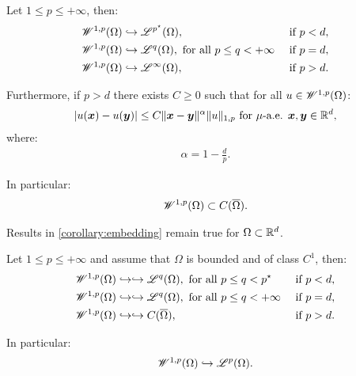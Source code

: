 \begin{corollary}
    Let $1 \leq p \leq +\infty$, then:
    \begin{align}
        & \mathscr{W}^{1, p}(\Omega) \hookrightarrow \mathscr{L}^{p^{\star}}(\Omega), & \text{ if } p < d, \\
        & \mathscr{W}^{1, p}(\Omega) \hookrightarrow \mathscr{L}^{q}(\Omega), \text{ for all } p \leq q < +\infty & \text{ if } p = d, \\
        & \mathscr{W}^{1, p}(\Omega) \hookrightarrow \mathscr{L}^{\infty}(\Omega), & \text{ if } p > d.
    \end{align}

    Furthermore, if $p > d$ there exists $C \geq 0$ such that for all $u \in \mathscr{W}^{1, p}(\Omega)$:
    \begin{gather}
        \lvert u(\bm{x}) - u(\bm{y}) \rvert \leq C \lVert \bm{x} - \bm{y} \rVert^{\alpha} \lVert u \rVert_{1, p} \text{ for } \mu \text{-a.e. } \bm{x}, \bm{y} \in \mathbb{R}^{d},
    \end{gather}
    where:
    \begin{gather}
        \alpha = 1 - \frac{d}{p}.
    \end{gather}

    In particular:
    \begin{gather}
        \mathscr{W}^{1, p}(\Omega) \subset C(\overline{\Omega}).
    \end{gather}
\end{corollary}

\begin{corollary}
    Results in \ref{corollary:embedding} remain true for $\Omega \subset \mathbb{R}^{d}$.
\end{corollary}

\begin{theorem}
    Let $1 \leq p \leq +\infty$ and assume that $\Omega$ is bounded and of class $C^1$, then:
    \begin{align}
        & \mathscr{W}^{1, p}(\Omega) \hookrightarrow \hookrightarrow \mathscr{L}^{q}(\Omega), \text{ for all } p \leq q < p^{\star} & \text{ if } p < d, \\
        & \mathscr{W}^{1, p}(\Omega) \hookrightarrow \hookrightarrow \mathscr{L}^{q}(\Omega), \text{ for all } p \leq q < +\infty & \text{ if } p = d, \\
        & \mathscr{W}^{1, p}(\Omega) \hookrightarrow \hookrightarrow C(\overline{\Omega}), & \text{ if } p > d.
    \end{align}

    In particular:
    \begin{gather}
        \mathscr{W}^{1, p}(\Omega) \hookrightarrow \mathscr{L}^{p}(\Omega).
    \end{gather}
\end{theorem}

